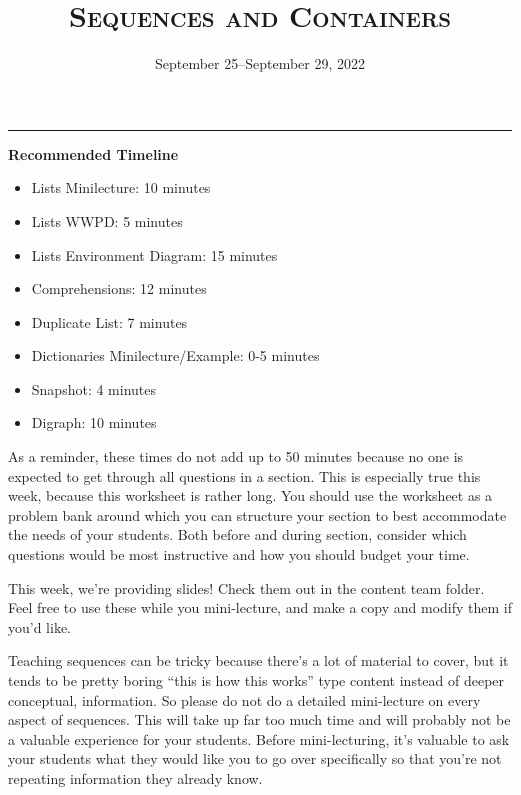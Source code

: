 \documentclass{exam}
\title{\textsc{Sequences and Containers}}
\date{September 25--September 29, 2022}
\begin{document}
\maketitle
\rule{\textwidth}{0.15em}
\fontsize{12}{15}\selectfont


\begin{meta}
    \textbf{Recommended Timeline}
    \begin{itemize}
        \item Lists Minilecture: 10 minutes
        \item Lists WWPD: 5 minutes
        \item Lists Environment Diagram: 15 minutes
        \item Comprehensions: 12 minutes
        \item Duplicate List: 7 minutes
        \item Dictionaries Minilecture/Example: 0-5 minutes
        \item Snapshot: 4 minutes
        \item Digraph: 10 minutes
    \end{itemize}

    As a reminder, these times do not add up to 50 minutes because no one is expected 
    to get through all questions in a section. This is especially true this week, 
    because this worksheet is rather long. You should use the worksheet as a problem bank
    around which you can structure your section to best accommodate the needs of your 
    students. Both before and during section, consider which questions would be most 
    instructive and how you should budget your time.

    This week, we're providing slides! Check them out in the content team folder. 
    Feel free to use these while you mini-lecture, and make a copy and modify them 
    if you'd like. 

    Teaching sequences can be tricky because there's a lot of material to cover, but 
    it tends to be pretty boring ``this is how this works'' type content instead of 
    deeper conceptual, information. So please do not do a detailed 
    mini-lecture on every aspect of sequences. This will take up far too much time and 
    will probably not be a valuable experience for your students. Before mini-lecturing, 
    it's valuable to ask your students what they would like you to go over specifically 
    so that you're not repeating information they already know. 
\end{meta}
\end{document}
